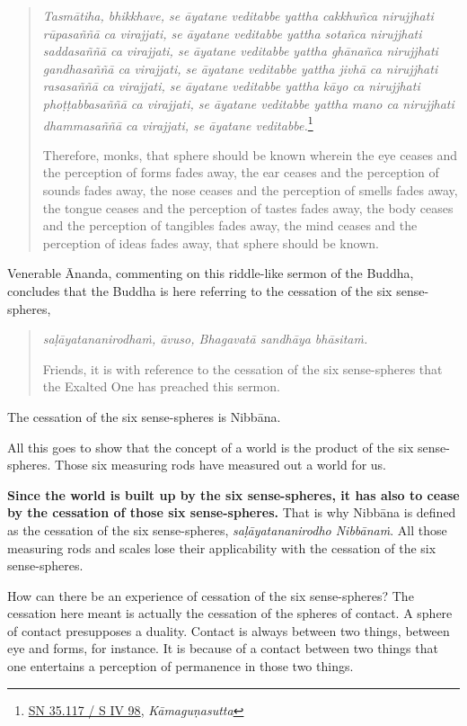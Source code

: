 \begin{quote}
\emph{Tasmātiha, bhikkhave, se āyatane veditabbe yattha cakkhuñca nirujjhati rūpasaññā ca virajjati, se āyatane veditabbe yattha sotañca nirujjhati saddasaññā ca virajjati, se āyatane veditabbe yattha ghānañca nirujjhati gandhasaññā ca virajjati, se āyatane veditabbe yattha jivhā ca nirujjhati rasasaññā ca virajjati, se āyatane veditabbe yattha kāyo ca nirujjhati phoṭṭabbasaññā ca virajjati, se āyatane veditabbe yattha mano ca nirujjhati dhammasaññā ca virajjati, se āyatane veditabbe.}\footnote{\href{https://suttacentral.net/sn35.117/pli/ms}{SN 35.117 / S IV 98}, \emph{Kāmaguṇasutta}}

Therefore, monks, that sphere should be known wherein the eye ceases and the perception of forms fades away, the ear ceases and the perception of sounds fades away, the nose ceases and the perception of smells fades away, the tongue ceases and the perception of tastes fades away, the body ceases and the perception of tangibles fades away, the mind ceases and the perception of ideas fades away, that sphere should be known.
\end{quote}

Venerable Ānanda, commenting on this riddle-like sermon of the Buddha, concludes that the Buddha is here referring to the cessation of the six sense-spheres,

\begin{quote}
\emph{saḷāyatananirodhaṁ, āvuso, Bhagavatā sandhāya bhāsitaṁ.}

Friends, it is with reference to the cessation of the six sense-spheres that the Exalted One has preached this sermon.
\end{quote}

The cessation of the six sense-spheres is Nibbāna.

All this goes to show that the concept of a world is the product of the six sense-spheres. Those six measuring rods have measured out a world for us.

\textbf{Since the world is built up by the six sense-spheres, it has also to cease by the cessation of those six sense-spheres.} That is why Nibbāna is defined as the cessation of the six sense-spheres, \emph{saḷāyatananirodho Nibbānaṁ}. All those measuring rods and scales lose their applicability with the cessation of the six sense-spheres.

How can there be an experience of cessation of the six sense-spheres? The cessation here meant is actually the cessation of the spheres of contact. A sphere of contact presupposes a duality. Contact is always between two things, between eye and forms, for instance. It is because of a contact between two things that one entertains a perception of permanence in those two things.


